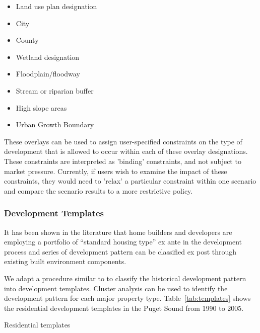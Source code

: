 \begin{itemize}
\item  Land use plan designation
\item  City
\item  County
\item  Wetland designation
\item  Floodplain/floodway
\item  Stream or riparian buffer
\item  High slope areas
\item  Urban Growth Boundary
\end{itemize}

These overlays can be used to assign user-specified constraints on
the type of development that is allowed to occur within each of
these overlay designations.  These constraints are interpreted as
'binding' constraints, and not subject to
market pressure.  Currently, if users wish to examine the impact of
these constraints, they would need to 'relax' a particular
constraint within one scenario and compare the scenario results to
a more restrictive policy.

\subsubsection{Development Templates}
\label{sec-development-templates}
%
It has been shown in the literature that home builders and
developers are employing a portfolio of ``standard housing
type'' ex ante in the development process and series of
development pattern can be classified ex post through
existing built environment components\cite{Song2007}. 

We adapt a procedure similar to \cite{Song2007} to classify
the historical development pattern into development
templates.  Cluster analysis can be used to identify the
development pattern for each major property type.
Table~\ref{tab:templates} shows the residential development
templates in the Puget Sound from 1990 to 2005.

\begin{landscape}
\begin{table}[ht]
\label{tab:templates}
\begin{center}
  \caption{Residential templates}

\end{center}
\end{table}
\end{landscape}

